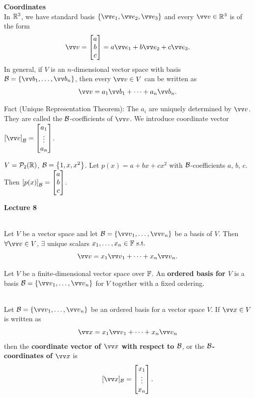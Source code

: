 \textbf{Coordinates} \\
In ${\mathbb{R}}^3$, we have standard basis $\left\{ \ve_1,\ve_2,\ve_3 \right\}$ and every $\vvv \in \R^3$ is of the form
\[\vvv = \cv{a \\ b \\ c} = a\ve_1 + b\ve_2 + c\ve_3.\]
In general, if $V$ is an $n$-dimensional vector space with basis $\mB = \left\{ \vvb_1,\ldots,\vvb_n \right\}$, then every $\vvv \in V$ can be written as
\[\vvv = a_1\vvb_1 + \cdots + a_n\vvb_n.\]

Fact (Unique Representation Theorem): The $a_i$ are uniquely determined by $\vvv$. They are called the $\mathcal{B}$-coefficients of $\vvv$. We introduce coordinate vector $\left[ \vvv \right]_{\mB} = \cv{a_1 \\ \vdots \\ a_n}$. 
\begin{example}
    $V = \mathcal{P}_2{({\mathbb{R}})}$, $\mathcal{B} = \left\{ 1,x,x^2 \right\}$. Let $p(x) = a + bx + cx^2$ with $\mathcal{B}$-coefficients $a$, $b$, $c$. Then $\left[ p(x) \right]_{\mathcal{B}} = \begin{bmatrix} a \\ b \\ c \end{bmatrix}$.
\end{example}

\makebox[\linewidth]{\hrulefill}
{\large \textbf{Lecture 8}}


\begin{theorem}
    \phantom{}\\
    Let $V$ be a vector space and let $\mB = \left\{  \vvv_1,\ldots,\vvv_n \right\}$ be a basis of $V$. Then $\forall \vvv \in V$, $\exists$ unique
    scalars $x_1,\ldots,x_n \in {\mathbb{F}} \text{ s.t. }$
    \[\vvv = x_1\vvv_1 + \cdots + x_n\vvv_n.\]  
\end{theorem}

\begin{definition}
    Let $V$ be a finite-dimensional vector space over ${\mathbb{F}}$. An \textbf{ordered basis for $V$} is a basis $\mB = \left\{  \vvv_1,\ldots,\vvv_n \right\}$
    for $V$ together with a fixed ordering.
\end{definition}

\begin{definition}
    \phantom{}\\
    Let $\mB = \left\{  \vvv_1,\ldots,\vvv_n \right\}$ be an ordered basis for a vector space $V$. If $\vx \in V$ is written as
    \[\vx = x_1\vvv_1 + \cdots + x_n\vvv_n\]
    then the \textbf{coordinate vector of $\vx$ with respect to $\mathcal{B}$}, or the \textbf{$\mathcal{B}$-coordinates of $\vx$} is
    \[[\vx]_{\mB} = \cv{x_1 \\ \vdots \\ x_n}.\]
\end{definition}

